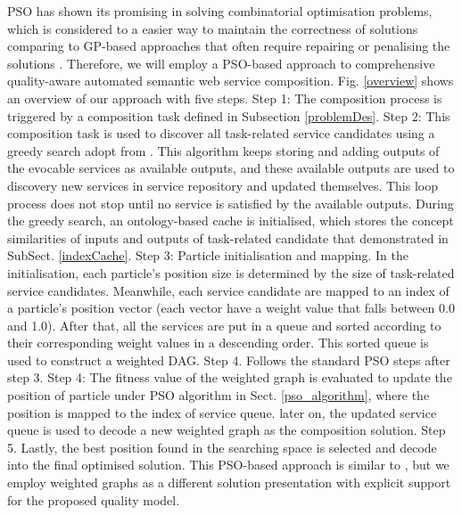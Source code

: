\documentclass{llncs}
\begin{document}
PSO has shown its promising in solving combinatorial optimisation problems, which is considered to a easier way to maintain the correctness of solutions comparing to GP-based approaches that often require repairing or penalising the solutions \cite{da2016particle}. Therefore, we will employ a PSO-based approach to comprehensive quality-aware automated semantic web service composition. Fig. \ref{overview} shows an overview of our approach with five steps. Step 1: The composition process is triggered by a composition task defined in Subsection \ref{problemDes}. Step 2: This composition task is used to discover all task-related service candidates using a greedy search adopt from \cite{ma2015hybrid}. This algorithm keeps storing and adding outputs of the evocable services as available outputs, and these available outputs are used to discovery new services in service repository and updated themselves. This loop process does not stop until no service is satisfied by the available outputs. During the greedy search, an ontology-based cache is initialised, which stores the concept similarities of inputs and outputs of task-related candidate that demonstrated in SubSect. \ref{indexCache}. Step 3: Particle initialisation and mapping. In the initialisation, each particle's position size is determined by the size of task-related service candidates. Meanwhile, each service candidate are mapped to an index of a particle’s position vector (each vector have a weight value that falls between 0.0 and 1.0). After that, all the services are put in a queue and sorted according to their corresponding weight values in a descending order. This sorted queue is used to construct a weighted DAG. Step 4. Follows the standard PSO steps after step 3. Step 4: The fitness value of the weighted graph is evaluated to update the position of particle under PSO algorithm in Sect. \ref{pso_algorithm}, where the position is mapped to the index of service queue. later on, the updated service queue is used to decode a new weighted graph as the composition solution. Step 5. Lastly, the best position found in the searching space is selected and decode into the final optimised solution. This PSO-based approach is similar to \cite{da2016particle}, but we employ weighted graphs as a different solution presentation with explicit support for the proposed quality model.
\end{document}
